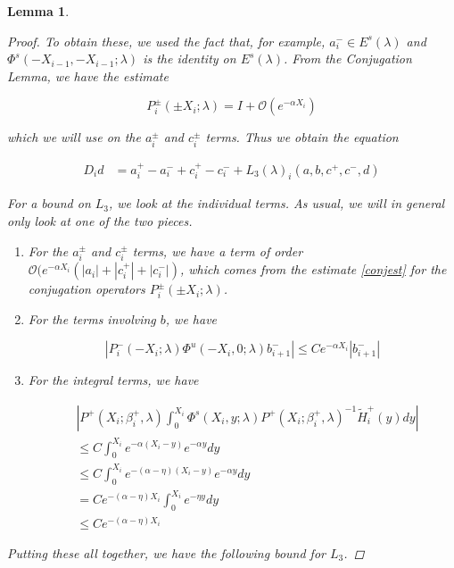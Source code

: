\documentclass[12pt]{article}
\newtheorem{lemma}{Lemma}
\begin{document}
\begin{lemma}
\begin{proof}
To obtain these, we used the fact that, for example, $a_i^- \in E^s(\lambda)$ and $\Phi^s(-X_{i-1}, -X_{i-1}; \lambda)$ is the identity on $E^s(\lambda)$. From the Conjugation Lemma, we have the estimate

\begin{equation}\label{conjest}
P_i^\pm(\pm X_i; \lambda) = I + \mathcal{O}(e^{-\alpha X_i})
\end{equation}

which we will use on the $a_i^\pm$ and $c_i^\pm$ terms. Thus we obtain the equation

\begin{align}\label{Dideq1}
D_i d &= a_i^+ - a_i^- + c_i^+ - c_i^- + L_3(\lambda)_i(a, b, c^+, c^-, d)
\end{align}

For a bound on $L_3$, we look at the individual terms. As usual, we will in general only look at one of the two pieces.

\begin{enumerate}

\item For the $a_i^\pm$ and $c_i^\pm$ terms, we have a term of order $\mathcal{O}(e^{-\alpha X_i}(|a_i| + |c_i^+| + |c_i^-|)$, which comes from the estimate \eqref{conjest} for the conjugation operators $P_i^\pm(\pm X_i; \lambda)$.

\item For the terms involving $b$, we have

\[
| P_i^-(-X_i; \lambda) \Phi^u(-X_i, 0; \lambda) b_{i+1}^-| \leq C e^{-\alpha X_i} |b_{i+1}
^-|
\]

\item For the integral terms, we have

\begin{align*}
&\left|
P^+(X_i; \beta_i^+, \lambda) \int_0^{X_i} \Phi^s(X_i, y; \lambda) P^+(X_i; \beta_i^+, \lambda)^{-1} \tilde{H}_i^+(y) dy \right| \\
&\leq C \int_0^{X_i} e^{-\alpha(X_i - y)}e^{-\alpha y} dy \\
&\leq C \int_0^{X_i} e^{-(\alpha - \eta)(X_i - y)}e^{-\alpha y} dy \\
&= C e^{-(\alpha - \eta) X_i} \int_0^{X_i} e^{-\eta y} dy \\ 
&\leq C e^{-(\alpha - \eta) X_i} 
\end{align*}

\end{enumerate}

Putting these all together, we have the following bound for $L_3$.


\end{proof}
\end{lemma}
\end{document}
